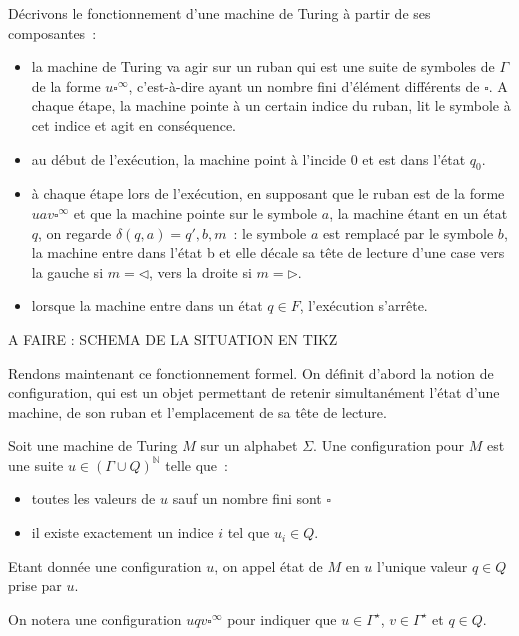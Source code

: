 Décrivons le fonctionnement d'une machine de Turing à partir de ses
composantes~:
\begin{itemize}
\item la machine de Turing va agir sur un ruban qui est une suite de symboles
  de $\Gamma$ de la forme $u\square^\infty$, c'est-à-dire ayant un nombre
  fini d'élément différents de $\square$. A chaque étape, la machine pointe à
  un certain indice du ruban, lit le symbole à cet indice et agit en
  conséquence.
\item au début de l'exécution, la machine point à l'incide $0$ et est dans
  l'état $q_0$.
\item à chaque étape lors de l'exécution, en supposant que le ruban est de la
  forme $uav\square^\infty$ et que la machine pointe sur le symbole $a$, la
  machine étant en un état $q$, on regarde $\delta(q,a) = q',b,m$~: le symbole
  $a$ est remplacé par le symbole $b$, la machine entre dans l'état b et elle
  décale sa tête de lecture d'une case vers la gauche si $m = \lhd$, vers la
  droite si $m = \rhd$.
\item lorsque la machine entre dans un état $q \in F$, l'exécution s'arrête.
\end{itemize}

A FAIRE : SCHEMA DE LA SITUATION EN TIKZ

Rendons maintenant ce fonctionnement formel. On définit d'abord la notion de
configuration, qui est un objet permettant de retenir simultanément l'état d'une
machine, de son ruban et l'emplacement de sa tête de lecture.

\begin{definition}
  Soit une machine de Turing $M$ sur un alphabet $\Sigma$. Une configuration
  pour $M$ est une suite $u \in (\Gamma\cup Q)^\mathbb N$ telle que~:
  \begin{itemize}
  \item toutes les valeurs de $u$ sauf un nombre fini sont $\square$
  \item il existe exactement un indice $i$ tel que $u_i \in Q$.
  \end{itemize}
  Etant donnée une configuration $u$, on appel état de $M$ en $u$ l'unique
  valeur $q \in Q$ prise par $u$.
\end{definition}

\begin{notation}
  On notera une configuration $uqv\square^\infty$ pour indiquer que
  $u \in \Gamma^\star$, $v \in \Gamma^\star$ et $q \in Q$.
\end{notation}

